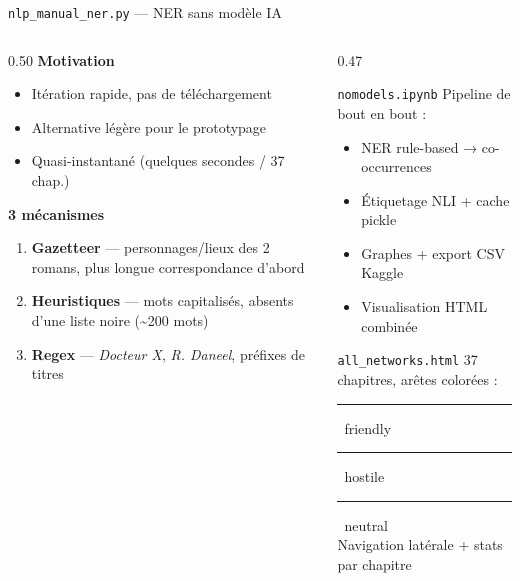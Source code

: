\documentclass[aspectratio=169]{beamer}
\begin{document}
\begin{frame}{\texttt{nlp\_manual\_ner.py} --- NER sans modèle IA}
  \small
  \begin{columns}[T]
    \begin{column}{0.50\textwidth}
      \textbf{Motivation}
      \begin{itemize}\setlength{\itemsep}{1pt}
        \item Itération rapide, pas de téléchargement
        \item Alternative légère pour le prototypage
        \item Quasi-instantané (quelques secondes / 37 chap.)
      \end{itemize}
      \vspace{3pt}
      \textbf{3 mécanismes}
      \begin{enumerate}\setlength{\itemsep}{1pt}
        \item \textbf{Gazetteer} --- personnages/lieux des 2 romans, plus longue correspondance d'abord
        \item \textbf{Heuristiques} --- mots capitalisés, absents d'une liste noire (\textasciitilde{}200 mots)
        \item \textbf{Regex} --- \emph{Docteur X}, \emph{R. Daneel}, préfixes de titres
      \end{enumerate}
    \end{column}
    \begin{column}{0.47\textwidth}
      \begin{block}{\texttt{nomodels.ipynb}}
        \footnotesize Pipeline de bout en bout :
        \begin{itemize}\setlength{\itemsep}{0pt}
          \item NER rule-based → co-occurrences
          \item Étiquetage NLI + cache pickle
          \item Graphes + export CSV Kaggle
          \item Visualisation HTML combinée
        \end{itemize}
      \end{block}
      \vspace{3pt}
      \begin{block}{\texttt{all\_networks.html}}
        \footnotesize
        37 chapitres, arêtes colorées :\\
        \textcolor{friendly}{\rule{7pt}{7pt}}~friendly \;
        \textcolor{hostile}{\rule{7pt}{7pt}}~hostile \;
        \textcolor{neutral}{\rule{7pt}{7pt}}~neutral\\
        Navigation latérale + stats par chapitre
      \end{block}
    \end{column}
  \end{columns}
\end{frame}
\end{document}
